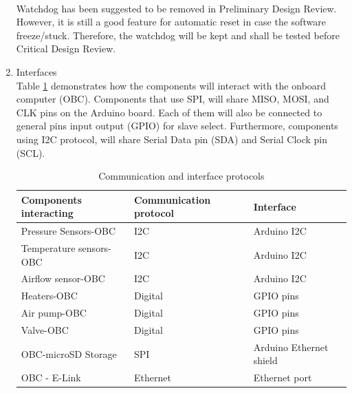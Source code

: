\documentclass[a4paper,12pt,twoside]{article}
\begin{document}
\begin{enumerate}[label=(\alph*)]
\\
Watchdog has been suggested to be removed in Preliminary Design Review. However, it is still a good feature for automatic reset in case the software freeze/stuck. Therefore, the watchdog will be kept and shall be tested before Critical Design Review.
\item{Interfaces}\\
Table \ref{tab:comIntpro} demonstrates how the components will interact with the onboard computer (OBC). Components that use SPI, will share MISO, MOSI, and CLK pins on the Arduino board. Each of them will also be connected to general pins input output (GPIO) for slave select. Furthermore, components using I2C protocol, will share Serial Data pin (SDA) and Serial Clock pin (SCL).

\begin{table}[H]
\centering
\begin{tabular}{lll}
Components interacting & Communication protocol & Interface                 \\ \hline
Pressure Sensors-OBC   & I2C                    & Arduino I2C \\
Temperature sensors-OBC        & I2C                    & Arduino I2C \\
Airflow sensor-OBC     & I2C                    & Arduino I2C \\
Heaters-OBC            & Digital                & GPIO pins \\
Air pump-OBC           & Digital                & GPIO pins \\
Valve-OBC              & Digital                & GPIO pins                 \\
OBC-microSD Storage    & SPI                    & Arduino Ethernet shield   \\
OBC - E-Link           & Ethernet               & Ethernet port            
\end{tabular}%
\caption{Communication and interface protocols}
\label{tab:comIntpro}
\end{table}


\end{enumerate}
\end{document}
